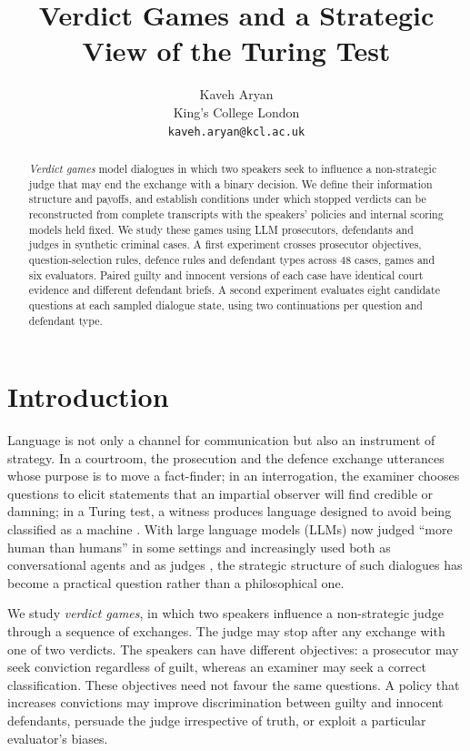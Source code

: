 \documentclass[10pt,a4paper]{article}
\title{\textbf{Verdict Games and a Strategic View of the Turing Test}}
\author{Kaveh Aryan\\King's College London\\\texttt{kaveh.aryan@kcl.ac.uk}}
\date{}
\theoremstyle{remark}
\begin{document}
\maketitle

\begin{abstract}
\noindent
\emph{Verdict games} model dialogues in which two speakers seek to influence a non-strategic judge that may end
the exchange with a binary decision. We define their information structure and payoffs, and establish conditions
under which stopped verdicts can be reconstructed from complete transcripts with the speakers' policies and internal
scoring models held fixed. We study these games using LLM prosecutors, defendants and judges in synthetic criminal
cases. A first experiment crosses prosecutor objectives, question-selection rules, defence rules and defendant types
across 48 cases, \SoneNgames{} games and six evaluators. Paired guilty and innocent versions of each case have identical
court evidence and different defendant briefs. A second experiment evaluates eight candidate questions at each sampled dialogue
state, using two continuations per question and defendant type. \AbstractFindings{}
\end{abstract}

\section{Introduction}

Language is not only a channel for communication but also an instrument of strategy. In a courtroom, the prosecution
and the defence exchange utterances whose purpose is to move a fact-finder; in an interrogation, the examiner chooses
questions to elicit statements that an impartial observer will find credible or damning; in a Turing test, a witness
produces language designed to avoid being classified as a machine \citep{oppy2021}. With large language models (LLMs)
now judged ``more human than humans'' in some settings \citep{rathi2024,jones2025} and increasingly used both as
conversational agents and as judges \citep{zheng2023}, the strategic structure of such dialogues has become a practical
question rather than a philosophical one.

We study \emph{verdict games}, in which two speakers influence a non-strategic judge through a sequence of exchanges.
The judge may stop after any exchange with one of two verdicts. The speakers can have different objectives: a
prosecutor may seek conviction regardless of guilt, whereas an examiner may seek a correct classification. These
objectives need not favour the same questions. A policy that increases convictions may improve discrimination between
guilty and innocent defendants, persuade the judge irrespective of truth, or exploit a particular evaluator's biases.
\end{document}

